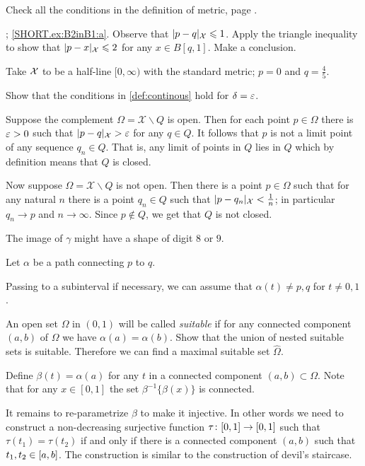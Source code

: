  Check all the conditions in the definition of metric, page \pageref{page:def:metric}.

\parbf{\ref{ex:B2inB1}}; \ref{SHORT.ex:B2inB1:a}.
Observe that $|p-q|_{\mathcal{X}}\leqslant 1$. 
Apply the triangle inequality to show that $|p-x|_{\mathcal{X}}\leqslant 2$ for any $x\in B[q,1]$.
Make a conclusion.

 Take $\mathcal{X}$ to be a half-line $[0,\infty)$ with the standard metric; $p=0$ and $q=\tfrac45$.

 Show that the conditions in \ref{def:continous} hold for $\delta=\varepsilon$.

Suppose the complement $\Omega=\mathcal{X}\backslash Q$ is open.
Then for each point $p\in \Omega$ there is $\varepsilon>0$ such that $|p-q|_{\mathcal{X}}>\varepsilon$ for any $q\in Q$.
It follows that $p$ is not a limit point of any sequence $q_n\in Q$.
That is, any limit of points in $Q$ lies in $Q$ which by definition means that $Q$ is closed.

Now suppose $\Omega=\mathcal{X}\backslash Q$ is not open.
Then there is a point $p\in \Omega$ such that for any natural $n$ there is a point $q_n\in Q$ such that $|p-q_n|_{\spc{X}}\z<\tfrac 1n$; in particular $q_n\to p$ and $n\to \infty$.
Since $p\notin Q$, we get that $Q$ is not closed.

 The image of $\gamma$ might have a shape of digit $8$ or $9$.

Let $\alpha$ be a path connecting $p$ to $q$.

Passing to a subinterval if necessary,
we can assume that $\alpha(t)\ne p,q$ for $t\ne0,1$.

An open set $\Omega$ in $(0,1)$ will be called {}\emph{suitable}
if for any connected component $(a,b)$ of $\Omega$ we have $\alpha(a)=\alpha(b)$.
Show that the union of nested suitable sets is suitable.
Therefore we can find a maximal suitable set $\hat \Omega$.

Define $\beta(t)=\alpha(a)$ for any $t$ in a connected component $(a,b)\subset\Omega$.
Note that for any $x\in [0,1]$ the set $\beta^{-1}\{\beta(x)\}$ is connected.

It remains to re-parametrize $\beta$ to make it injective.
In other words we need to construct a non-decreasing surjective function $\tau\:[0,1]\z\to[0,1]$ such that 
$\tau(t_1)=\tau(t_2)$ if and only if there is a connected component $(a,b)$ such that $t_1,t_2\z\in [a,b]$.
The construction is similar to the construction of devil's staircase.


